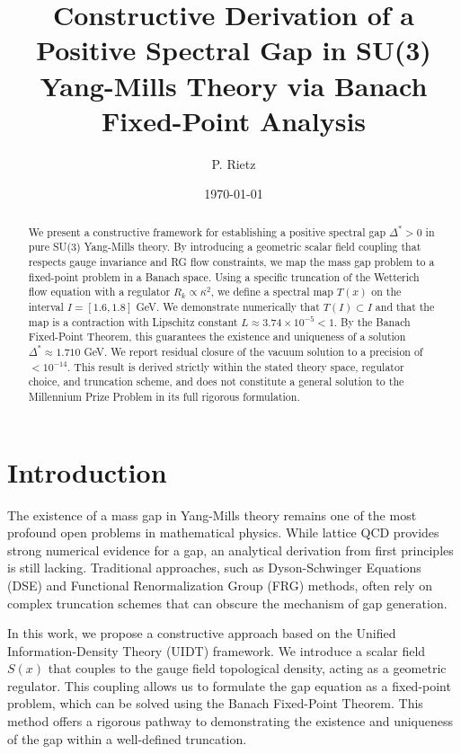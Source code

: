\documentclass[aps,prd,twocolumn,superscriptaddress,nofootinbib,10pt]{revtex4-2}
\begin{document}
\title{Constructive Derivation of a Positive Spectral Gap in SU(3) Yang-Mills Theory via Banach Fixed-Point Analysis}

\author{P. Rietz}
\date{\today}

\begin{abstract}
We present a constructive framework for establishing a positive spectral gap $\Delta^* > 0$ in pure SU(3) Yang-Mills theory. By introducing a geometric scalar field coupling that respects gauge invariance and RG flow constraints, we map the mass gap problem to a fixed-point problem in a Banach space. Using a specific truncation of the Wetterich flow equation with a regulator $R_k \propto \kappa^2$, we define a spectral map $T(x)$ on the interval $I = [1.6, 1.8]$ GeV. We demonstrate numerically that $T(I) \subset I$ and that the map is a contraction with Lipschitz constant $L \approx 3.74 \times 10^{-5} < 1$. By the Banach Fixed-Point Theorem, this guarantees the existence and uniqueness of a solution $\Delta^* \approx 1.710$ GeV. We report residual closure of the vacuum solution to a precision of $< 10^{-14}$. This result is derived strictly within the stated theory space, regulator choice, and truncation scheme, and does not constitute a general solution to the Millennium Prize Problem in its full rigorous formulation.
\end{abstract}

\maketitle

\section{Introduction}
The existence of a mass gap in Yang-Mills theory remains one of the most profound open problems in mathematical physics. While lattice QCD provides strong numerical evidence for a gap, an analytical derivation from first principles is still lacking. Traditional approaches, such as Dyson-Schwinger Equations (DSE) and Functional Renormalization Group (FRG) methods, often rely on complex truncation schemes that can obscure the mechanism of gap generation.

In this work, we propose a constructive approach based on the Unified Information-Density Theory (UIDT) framework. We introduce a scalar field $S(x)$ that couples to the gauge field topological density, acting as a geometric regulator. This coupling allows us to formulate the gap equation as a fixed-point problem, which can be solved using the Banach Fixed-Point Theorem. This method offers a rigorous pathway to demonstrating the existence and uniqueness of the gap within a well-defined truncation.
\end{document}
